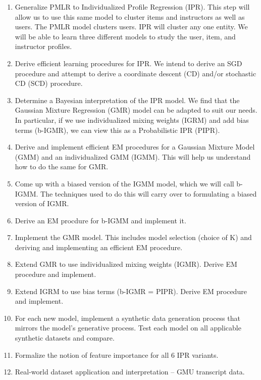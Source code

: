 \documentclass[10pt]{proc}
\begin{document}
\begin{enumerate}
    \item  Generalize PMLR to Individualized Profile Regression (IPR). This step
        will allow us to use this same model to cluster items and instructors as
        well as users. The PMLR model clusters users. IPR will cluster any one
        entity. We will be able to learn three different models to study the
        user, item, and instructor profiles.
    \item  Derive efficient learning procedures for IPR. We intend to derive an
        SGD procedure and attempt to derive a coordinate descent (CD) and/or
        stochastic CD (SCD) procedure.
    \item  Determine a Bayesian interpretation of the IPR model. We find that
        the Gaussian Mixture Regression (GMR) model can be adapted to suit our
        needs. In particular, if we use individualized mixing weights (IGRM) and
        add bias terms (b-IGMR), we can view this as a Probabilistic IPR (PIPR).
    \item  Derive and implement efficient EM procedures for a Gaussian Mixture
        Model (GMM) and an individualized GMM (IGMM). This will help us
        understand how to do the same for GMR.
    \item  Come up with a biased version of the IGMM model, which we will call
        b-IGMM. The techniques used to do this will carry over to formulating a
        biased version of IGMR.
    \item  Derive an EM procdure for b-IGMM and implement it.
    \item  Implement the GMR model. This includes model selection (choice of K)
        and deriving and implementing an efficient EM procedure.
    \item  Extend GMR to use individualized mixing weights (IGMR). Derive EM
        procedure and implement.
    \item  Extend IGRM to use bias terms (b-IGMR = PIPR). Derive EM procedure
        and implement.
    \item  For each new model, implement a synthetic data generation process
        that mirrors the model's generative process. Test each model on all
        applicable synthetic datasets and compare.
    \item  Formalize the notion of feature importance for all 6 IPR variants.
    \item  Real-world dataset application and interpretation -- GMU transcript
        data.
\end{enumerate}
\end{document}
